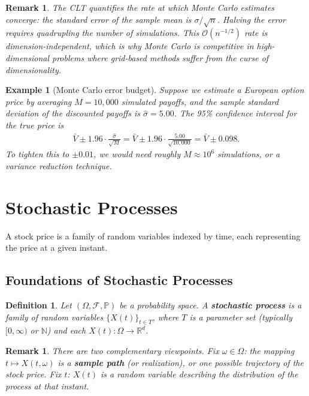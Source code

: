 \documentclass{report}
\theoremstyle{spacedplain}
\theoremstyle{spaceddefinition}
\newtheorem{definition}[theorem]{Definition}
\newtheorem{example}[theorem]{Example}
\theoremstyle{spacedremark}
\newtheorem{remark}[theorem]{Remark}
\begin{document}
\begin{remark}
The CLT quantifies the rate at which Monte Carlo estimates converge: the standard error of the sample mean is $\sigma/\sqrt{n}$. Halving the error requires quadrupling the number of simulations. This $\mathcal{O}(n^{-1/2})$ rate is dimension-independent, which is why Monte Carlo is competitive in high-dimensional problems where grid-based methods suffer from the curse of dimensionality.
\end{remark}

\begin{example}[Monte Carlo error budget]
Suppose we estimate a European option price by averaging $M = 10{,}000$ simulated payoffs, and the sample standard deviation of the discounted payoffs is $\hat{\sigma} = 5.00$. The 95\% confidence interval for the true price is
\begin{align}
    \bar{V} \pm 1.96 \cdot \frac{\hat{\sigma}}{\sqrt{M}} = \bar{V} \pm 1.96 \cdot \frac{5.00}{\sqrt{10{,}000}} = \bar{V} \pm 0.098.
\end{align}
To tighten this to $\pm 0.01$, we would need roughly $M \approx 10^6$ simulations, or a variance reduction technique.
\end{example}


\section{Stochastic Processes}

A stock price is a family of random variables indexed by time, each representing the price at a given instant. 

\subsection{Foundations of Stochastic Processes}

\begin{definition}
Let $(\Omega, \mathcal{F}, \mathbb{P})$ be a probability space. A \textbf{stochastic process} is a family of random variables $\{X(t)\}_{t \in T}$, where $T$ is a parameter set (typically $[0,\infty)$ or $\mathbb{N}$) and each $X(t): \Omega \to \mathbb{R}^d$.
\end{definition}

\begin{remark}
There are two complementary viewpoints. Fix $\omega \in \Omega$: the mapping $t \mapsto X(t, \omega)$ is a \textbf{sample path} (or realization), or one possible trajectory of the stock price. Fix $t$: $X(t)$ is a random variable describing the distribution of the process at that instant.
\end{remark}
\end{document}
